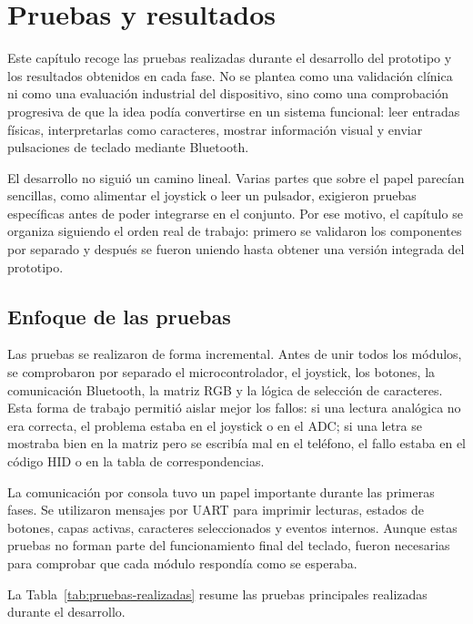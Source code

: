 \chapter{Pruebas y resultados}
\label{ch:pruebas-resultados}

Este capítulo recoge las pruebas realizadas durante el desarrollo del prototipo y los resultados obtenidos en cada fase. No se plantea como una validación clínica ni como una evaluación industrial del dispositivo, sino como una comprobación progresiva de que la idea podía convertirse en un sistema funcional: leer entradas físicas, interpretarlas como caracteres, mostrar información visual y enviar pulsaciones de teclado mediante Bluetooth.

El desarrollo no siguió un camino lineal. Varias partes que sobre el papel parecían sencillas, como alimentar el joystick o leer un pulsador, exigieron pruebas específicas antes de poder integrarse en el conjunto. Por ese motivo, el capítulo se organiza siguiendo el orden real de trabajo: primero se validaron los componentes por separado y después se fueron uniendo hasta obtener una versión integrada del prototipo.

\section{Enfoque de las pruebas}
\label{sec:enfoque-pruebas}

Las pruebas se realizaron de forma incremental. Antes de unir todos los módulos, se comprobaron por separado el microcontrolador, el joystick, los botones, la comunicación Bluetooth, la matriz RGB y la lógica de selección de caracteres. Esta forma de trabajo permitió aislar mejor los fallos: si una lectura analógica no era correcta, el problema estaba en el joystick o en el ADC; si una letra se mostraba bien en la matriz pero se escribía mal en el teléfono, el fallo estaba en el código HID o en la tabla de correspondencias.

La comunicación por consola tuvo un papel importante durante las primeras fases. Se utilizaron mensajes por UART para imprimir lecturas, estados de botones, capas activas, caracteres seleccionados y eventos internos. Aunque estas pruebas no forman parte del funcionamiento final del teclado, fueron necesarias para comprobar que cada módulo respondía como se esperaba.

La Tabla~\ref{tab:pruebas-realizadas} resume las pruebas principales realizadas durante el desarrollo.

